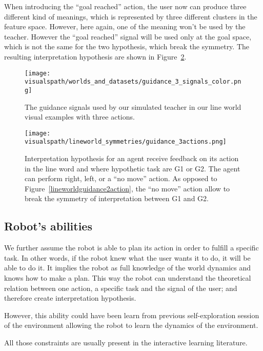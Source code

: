 When introducing the ``goal reached'' action, the user now can produce three different kind of meanings, which is represented by three different clusters in the feature space. However, here again, one of the meaning won't be used by the teacher. However the ``goal reached'' signal will be used only at the goal space, which is not the same for the two hypothesis, which break the symmetry. The resulting interpretation hypothesis are shown in Figure~\ref{fig:lineworldguidance3action}.

\begin{figure}[!ht]
  \centering
  \texttt{[image: \\visualspath/worlds\_and\_datasets/guidance\_3\_signals\_color.png]}
  \caption{The guidance signals used by our simulated teacher in our line world visual examples with three actions.}
  \label{fig:lineworldguidance3signals}
\end{figure}

\begin{figure}[!ht]
  \centering
  \texttt{[image: \\visualspath/lineworld\_symmetries/guidance\_3actions.png]}
  \caption{Interpretation hypothesis for an agent receive feedback on its action in the line word and where hypothetic task are G1 or G2. The agent can perform right, left, or a ``no move'' action. As opposed to Figure~\ref{lineworldguidance2action}, the ``no move'' action allow to break the symmetry of interpretation between G1 and G2.}
  \label{fig:lineworldguidance3action}
\end{figure}

\subsection{Robot's abilities}

We further assume the robot is able to plan its action in order to fulfill a specific task. In other words, if the robot knew what the user wants it to do, it will be able to do it. It implies the robot as full knowledge of the world dynamics and knows how to make a plan. This way the robot can understand the theoretical relation between one action, a specific task and the signal of the user; and therefore create interpretation hypothesis.

However, this ability could have been learn from previous self-exploration session of the environment allowing the robot to learn the dynamics of the environment.

\transition

All those constraints are usually present in the interactive learning literature. 

